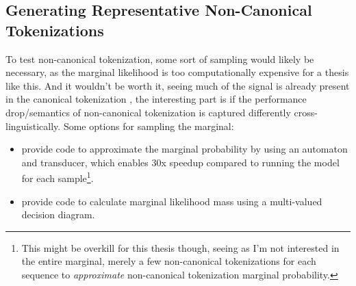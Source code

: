 \documentclass[a4paper]{article}
\begin{document}
\subsection{Generating Representative Non-Canonical Tokenizations}

To test non-canonical tokenization, some sort of sampling would likely be necessary, as the marginal likelihood is too computationally expensive for a thesis like this. And it wouldn't be worth it, seeing much of the signal is already present in the canonical tokenization \parencite{geh2024}, the interesting part is if the performance drop/semantics of non-canonical tokenization is captured differently cross-linguistically. Some options for sampling the marginal:
\begin{itemize}
    \item \textcite{pohl2025} provide code to approximate the marginal probability by using an automaton and transducer, which enables 30x speedup compared to running the model for each sample\footnote{This might be overkill for this thesis though, seeing as I'm not interested in the entire marginal, merely a few non-canonical tokenizations for each sequence to \textit{approximate} non-canonical tokenization marginal probability.}.
    \item \textcite{geh2024} provide code to calculate marginal likelihood mass using a multi-valued decision diagram.
\end{itemize}
\end{document}
